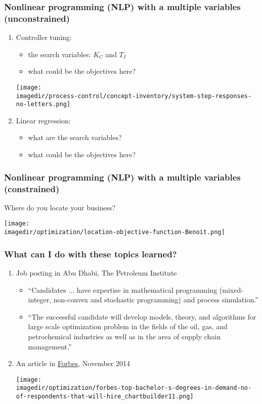 \begin{frame}\frametitle{Nonlinear programming (NLP) with a multiple variables (unconstrained)}
	
	\begin{enumerate}
		\item	Controller tuning:
		\begin{itemize}
			\item	the search variables: $K_C$ and $T_I$
			\item	what could be the objectives here?
		\end{itemize}
		\centerline{\texttt{[image: \\imagedir/process-control/concept-inventory/system-step-responses-no-letters.png]}}
		
		\item	Linear regression:
			\begin{itemize}
				\item	what are the search variables?
				\item	what could be the objectives here?
			\end{itemize}
	\end{enumerate}	
\end{frame}

\begin{frame}\frametitle{Nonlinear programming (NLP) with a multiple variables (constrained)}
	
	Where do you locate your business?
	
	\centerline{\texttt{[image: \\imagedir/optimization/location-objective-function-Benoit.png]}}
	
\end{frame}


\begin{frame}\frametitle{What can I do with these topics learned?}
	
	\begin{enumerate}
		\item	Job posting in Abu Dhabi, The Petroleum Institute
		\begin{itemize}
			\item	``Candidates ... have expertise in mathematical programming (mixed-integer, non-convex and stochastic
	programming) and process simulation.''
			
			\item	``The successful candidate will develop models, theory, and algorithms for large scale optimization problem in the fields of the oil, gas, and petrochemical industries as well as in the area of supply chain management.''
		\end{itemize}
		
		
		\item	An article in \href{http://www.forbes.com/sites/susanadams/2014/11/12/top-degrees-for-getting-hired-in-2015/}{Forbes}, November 2014 
	
			\centerline{\texttt{[image: \\imagedir/optimization/forbes-top-bachelor-s-degrees-in-demand-no-of-respondents-that-will-hire\_chartbuilder11.png]}}
	\end{enumerate}
\end{frame}


